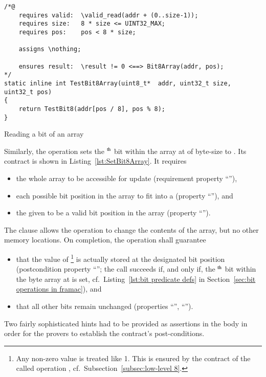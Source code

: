 \begin{listing}[hbt]
\begin{minipage}{0.99\textwidth}
\begin{lstlisting}[style=acsl-block]
/*@
    requires valid:  \valid_read(addr + (0..size-1));
    requires size:   8 * size <= UINT32_MAX;
    requires pos:    pos < 8 * size;

    assigns \nothing;

    ensures result:  \result != 0 <==> Bit8Array(addr, pos);
*/
static inline int TestBit8Array(uint8_t*  addr, uint32_t size, uint32_t pos)
{
    return TestBit8(addr[pos / 8], pos % 8);
}
\end{lstlisting}
\end{minipage}
\caption{\label{lst:TestBit8Array}Reading a bit of an  array}
\end{listing}










Similarly, the operation 
sets the
$^{\mbox{\scriptsize th}}$ bit within the array at
 of
byte-size  to .
%
Its contract is shown in Listing~\ref{lst:SetBit8Array}.
%
It requires
%
\begin{itemize}
\item the whole array to be accessible for update (requirement
	property ``''),
\item each possible bit position in the array to fit into a
	 (property ``''), and
\item the given  to be a valid bit position in the array
	(property ``'').
\end{itemize}
%
The  clause allows the operation to change the
contents of the array,
but no other memory locations.
%
On completion, the operation shall guarantee
\begin{itemize}
\item that the value of \footnote{
		Any non-zero  value is treated like 1.
		This is ensured by the contract of the called operation
		, cf.\ Subsection~\ref{subsec:low-level 8}.
	}
	is actually stored at the designated bit
	position (postcondition property ``'';
	the call  succeeds if, and only if, the
	$^{\mbox{\scriptsize th}}$ bit within the byte
	array at  is set, 
	cf.\ Listing~\ref{lst:bit predicate defs} in
	Section~\ref{sec:bit operations in framac}), and
\item that all other bits remain unchanged 
	(properties ``'', ``'').
\end{itemize}
%
Two fairly sophisticated hints had to be provided as assertions in
the body in order for
the provers to establish the contract's post-conditions.









